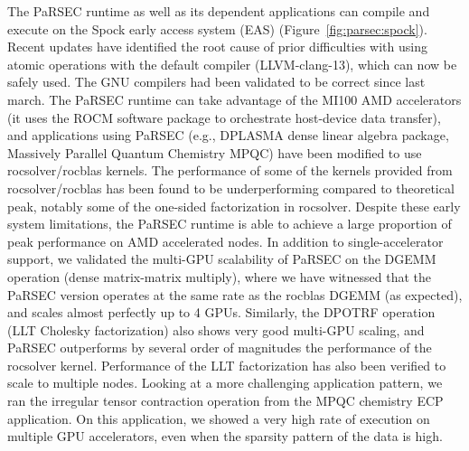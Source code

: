 The PaRSEC runtime as well as its dependent applications can compile and 
execute on the Spock early access system (EAS) (Figure~\ref{fig:parsec:spock}). Recent updates have identified
the root cause of prior difficulties with using atomic operations with the 
default compiler (LLVM-clang-13), which can now be safely used. The GNU compilers had been validated to be correct since last march.
%
The PaRSEC runtime can take advantage of the MI100 AMD accelerators (it uses the ROCM
software package to orchestrate host-device data transfer), and applications
using PaRSEC (e.g., DPLASMA dense linear algebra package, Massively Parallel Quantum Chemistry MPQC) have been modified to use rocsolver/rocblas
kernels. The performance of some of the kernels provided from rocsolver/rocblas 
has been found to be underperforming compared to theoretical peak, notably some
of the one-sided factorization in rocsolver. Despite these early system limitations, the PaRSEC
runtime is able to achieve a large proportion of peak performance on AMD
accelerated nodes. In addition to single-accelerator support, we validated the
multi-GPU scalability of PaRSEC on the DGEMM operation (dense matrix-matrix multiply),
where we have witnessed that the PaRSEC
version operates at the same rate as the rocblas DGEMM (as expected), and 
scales almost perfectly up to 4 GPUs. Similarly, the DPOTRF operation (LLT Cholesky factorization)
also shows very good multi-GPU scaling, and PaRSEC outperforms by
several order of magnitudes the performance of the rocsolver kernel. Performance of
the LLT factorization has also been verified to scale to multiple nodes. Looking at a
more challenging application pattern, we ran the irregular tensor contraction operation
from the MPQC chemistry ECP application. On this application, we showed a
very high rate of execution on multiple GPU accelerators, even when the sparsity
pattern of the data is high.

